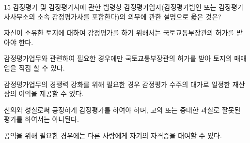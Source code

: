 \begin{question}{15}
감정평가 및 감정평가사에 관한 법령상 감정평가업자(감정평가법인 또는 감정평가사사무소의 소속 감정평가사를 포함한다)의 의무에 관한 설명으로 옳은 것은?
\begin{choices}
  \item 자신이 소유한 토지에 대하여 감정평가를 하기 위해서는 국토교통부장관의 허가를 받아야 한다.
  \item 감정평가업무와 관련하여 필요한 경우에만 국토교통부장관의 허가를 받아 토지의 매매업을 직접 할 수 있다.
  \item 감정평가업무의 경쟁력 강화를 위해 필요한 경우 감정평가 수주의 대가로 일정한 재산상의 이익을 제공할 수 있다.
  \item 신의와 성실로써 공정하게 감정평가를 하여야 하며, 고의 또는 중대한 과실로 잘못된 평가를 하여서는 아니된다.
  \item 공익을 위해 필요한 경우에는 다른 사람에게 자기의 자격증을 대여할 수 있다.
\end{choices}
\end{question}
